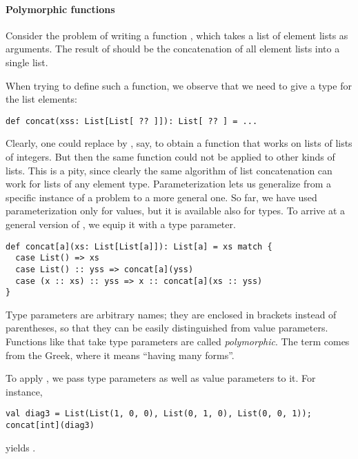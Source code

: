 \documentclass[a4paper,12pt,twoside,titlepage]{book}
\begin{document}
\paragraph{Polymorphic functions} Consider the problem of writing a
  function , which takes a list of element lists as
  arguments. The result of  should be the concatenation of all
  element lists into a single list. 

When trying to define such a function, we observe that we need to give
a type for the list elements:
\begin{lstlisting}
def concat(xss: List[List[ ?? ]]): List[ ?? ] = ...
\end{lstlisting}
Clearly, one could replace  by , say, to obtain a
function  that works on lists of lists of integers. But then the
same function could not be applied to other kinds of lists. This is a
pity, since clearly the same algorithm of list concatenation can work
for lists of any element type. Parameterization lets us generalize
from a specific instance of a problem to a more general one. So far,
we have used parameterization only for values, but it is available
also for types. To arrive at a general version of , we 
equip it with a type parameter.
\begin{lstlisting}
def concat[a](xs: List[List[a]]): List[a] = xs match {
  case List() => xs
  case List() :: yss => concat[a](yss)
  case (x :: xs) :: yss => x :: concat[a](xs :: yss)
}
\end{lstlisting}
Type parameters are arbitrary names; they are enclosed in brackets
instead of parentheses, so that they can be easily distinguished from
value parameters. Functions like  that take type
parameters are called {\em polymorphic}. The term comes from the
Greek, where it means ``having many forms''.

To apply , we pass type parameters as well as value
parameters to it. For instance,
\begin{lstlisting}
val diag3 = List(List(1, 0, 0), List(0, 1, 0), List(0, 0, 1));
concat[int](diag3)
\end{lstlisting}
yields .
\end{document}

